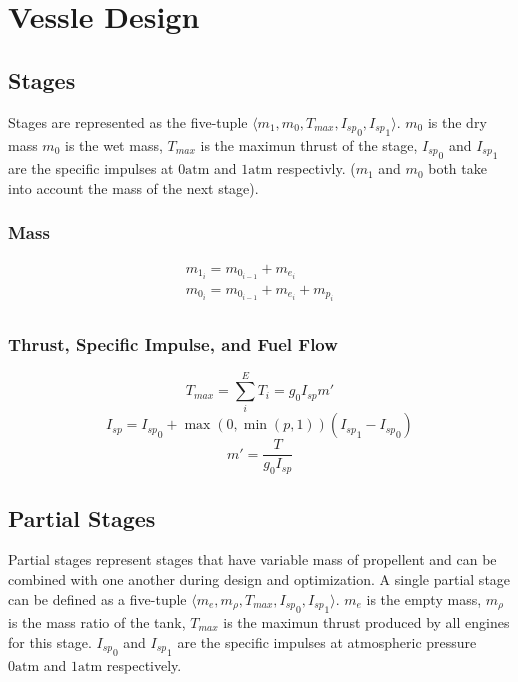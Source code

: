 \section{Vessle Design}
\subsection{Stages}
Stages are represented as the five-tuple $\langle m_1, m_0, T_{max}, {I_{sp}}_0, {I_{sp}}_1 \rangle$. $m_0$ is the dry mass
$m_0$ is the wet mass, $T_{max}$ is the maximun thrust of the stage, ${I_{sp}}_0$ and ${I_{sp}}_1$ are the specific impulses at
$0\mathrm{atm}$ and $1\mathrm{atm}$ respectivly. ($m_1$ and $m_0$ both take into account the mass of the next stage).
\subsubsection{Mass}
\begin{equation}
    \label{stage_mass}
    \begin{array}{c}
        m_{1_i} = m_{0_{i-1}} + m_{e_{i}} \\
        m_{0_i} = m_{0_{i-1}} + m_{e_{i}} + m_{p_{i}} \\
    \end{array}
\end{equation}
\subsubsection{Thrust, Specific Impulse, and Fuel Flow}
\begin{equation}
    \label{stage_thrust_max}
    T_{max} = \sum^{E}_{i}{T_{i}} = g_{0}I_{sp}m'
\end{equation}
\begin{equation}
    \label{stage_isp}
    I_{sp} = {I_{sp}}_{0}+\max\left(0,\min\left(p,1\right)\right)\left({I_{sp}}_{1} - {I_{sp}}_{0}\right)
\end{equation}
\begin{equation}
    \label{stage_ff}
    m' = \frac{T}{g_{0}I_{sp}}
\end{equation}
\subsection{Partial Stages}
Partial stages represent stages that have variable mass of propellent and can be combined with one another during design
and optimization. A single partial stage can be defined as a five-tuple $\langle m_e, m_{\rho}, T_{max}, {I_{sp}}_0, {I_{sp}}_1 \rangle$.
$m_e$ is the empty mass, $m_{\rho}$ is the mass ratio of the tank, $T_{max}$ is the maximun thrust produced by all engines
for this stage. ${I_{sp}}_0$ and ${I_{sp}}_1$ are the specific impulses at atmospheric pressure $0\mathrm{atm}$ and
$1\mathrm{atm}$ respectively.
